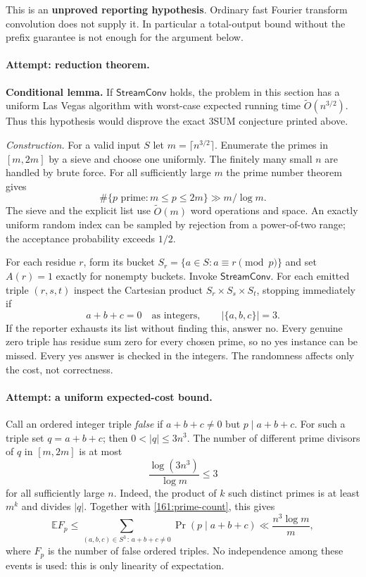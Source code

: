 \documentclass[11pt,a4paper]{article}
\newcommand{\E}{\mathbb{E}}
\numberwithin{equation}{section}
\begin{document}
This is an \textbf{unproved reporting hypothesis}. Ordinary fast Fourier
transform convolution does not supply it. In particular a total-output
bound without the prefix guarantee is not enough for the argument below.

\paragraph{Attempt: reduction theorem.}
\textbf{Conditional lemma.} If $\mathsf{StreamConv}$ holds, the problem in
this section has a uniform Las Vegas algorithm with worst-case expected
running time $\widetilde O(n^{3/2})$. Thus this hypothesis would disprove
the exact 3SUM conjecture printed above.

\emph{Construction.} For a valid input $S$ let
$m=\lceil n^{3/2}\rceil$. Enumerate the primes in $[m,2m]$ by a sieve and
choose one uniformly. The finitely many small $n$ are handled by brute
force. For all sufficiently large $m$ the prime number theorem gives
\begin{equation}\label{161:prime-count}
 \#\{p\text{ prime}:m\le p\le2m\}\gg m/\log m.
\end{equation}
The sieve and the explicit list use $\widetilde O(m)$ word operations and
space. An exactly uniform random index can be sampled by rejection from
a power-of-two range; the acceptance probability exceeds $1/2$.

For each residue $r$, form its bucket
$S_r=\{a\in S:a\equiv r\pmod p\}$ and set
$A(r)=1$ exactly for nonempty buckets. Invoke $\mathsf{StreamConv}$.
For each emitted triple $(r,s,t)$ inspect the Cartesian product
$S_r\times S_s\times S_t$, stopping immediately if
\[
 a+b+c=0\quad\text{as integers},\qquad |\{a,b,c\}|=3.
\]
If the reporter exhausts its list without finding this, answer no.
Every genuine zero triple has residue sum zero for every chosen prime,
so no yes instance can be missed. Every yes answer is checked in the
integers. The randomness affects only the cost, not correctness.

\paragraph{Attempt: a uniform expected-cost bound.}
Call an ordered integer triple \emph{false} if $a+b+c\ne0$ but
$p\mid a+b+c$. For such a triple set $q=a+b+c$; then
$0<|q|\le3n^3$. The number of different prime divisors of $q$ in
$[m,2m]$ is at most
\begin{equation}\label{161:divisor-count}
 \frac{\log(3n^3)}{\log m}\le3
\end{equation}
for all sufficiently large $n$. Indeed, the product of $k$ such distinct
primes is at least $m^k$ and divides $|q|$. Together with
\eqref{161:prime-count}, this gives
\begin{equation}\label{161:false}
 \E F_p
 \le \sum_{(a,b,c)\in S^3\, :\,a+b+c\ne0}
       \Pr(p\mid a+b+c)
 \ll \frac{n^3\log m}{m},
\end{equation}
where $F_p$ is the number of false ordered triples. No independence among
these events is used: this is only linearity of expectation.
\end{document}
